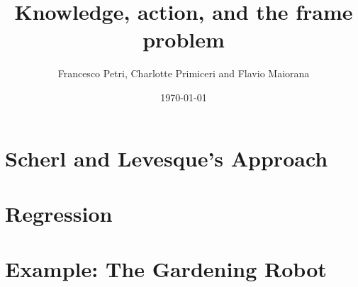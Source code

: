 \documentclass{beamer}
\title{Knowledge, action, and the frame problem}
\author{Francesco Petri, Charlotte Primiceri and Flavio Maiorana}
\date{\today}
\begin{document}
\maketitle


\section{Scherl and Levesque's Approach}


\section{Regression}

\section{Example: The Gardening Robot}


\footlinecolor{}

\backmatter
\end{document}
